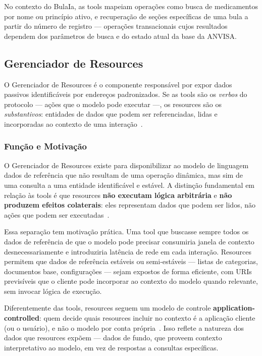 \documentclass[12pt]{article}
\begin{document}
No contexto do BulaIa, as tools mapeiam operações como busca de
medicamentos por nome ou princípio ativo, e recuperação de seções
específicas de uma bula a partir do número de registro --- operações
transacionais cujos resultados dependem dos parâmetros de busca e do
estado atual da base da ANVISA.

\subsection{Gerenciador de Resources}
\label{subsec:resource-manager}

O Gerenciador de Resources é o componente responsável por expor dados
passivos identificáveis por endereços padronizados. Se as tools são os
\emph{verbos} do protocolo --- ações que o modelo pode executar ---,
os resources são os \emph{substantivos}: entidades de dados que podem
ser referenciadas, lidas e incorporadas ao contexto de uma
interação~\cite{getknit2025mcp}.

\subsubsection{Função e Motivação}

O Gerenciador de Resources existe para disponibilizar ao modelo de
linguagem dados de referência que não resultam de uma operação dinâmica,
mas sim de uma consulta a uma entidade identificável e estável. A
distinção fundamental em relação às tools é que resources \textbf{não
executam lógica arbitrária} e \textbf{não produzem efeitos colaterais}:
eles representam dados que podem ser lidos, não ações que podem ser
executadas~\cite{kubaski2025mcp}.

Essa separação tem motivação prática. Uma tool que buscasse sempre todos
os dados de referência de que o modelo pode precisar consumiria janela de
contexto desnecessariamente e introduziria latência de rede em cada
interação. Resources permitem que dados de referência estáveis ou
semi-estáveis --- listas de categorias, documentos base, configurações ---
sejam expostos de forma eficiente, com URIs previsíveis que o cliente
pode incorporar ao contexto do modelo quando relevante, sem invocar
lógica de execução.

Diferentemente das tools, resources seguem um modelo de controle
\textbf{application-controlled}: quem decide quais resources incluir no
contexto é a aplicação cliente (ou o usuário), e não o modelo por conta
própria~\cite{dailydoseofds2025mcp}. Isso reflete a natureza dos dados que
resources expõem --- dados de fundo, que proveem contexto interpretativo
ao modelo, em vez de respostas a consultas específicas.
\end{document}
